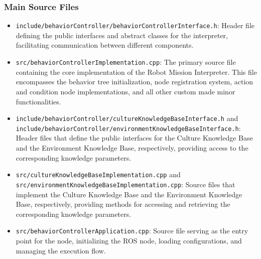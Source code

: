 \documentclass{CSSRforAfrica}
\begin{document}
\subsubsection{Main Source Files}
\begin{itemize}
    \item \texttt{\small include/behaviorController/\textnormal{behaviorControllerInterface.h}}: Header file \\ defining the public interfaces and abstract classes for the interpreter, facilitating communication between different components.

    \item \texttt{\small src/\textnormal{behaviorControllerImplementation.cpp}}: The primary source file containing the core implementation of the Robot Mission Interpreter. This file encompasses the behavior tree initialization, node registration system, action and condition node implementations, and all other custom made minor functionalities.

    \item \texttt{\small include/behaviorController/\textnormal{cultureKnowledgeBaseInterface.h}} and \\ \texttt{\small include/behaviorController/\textnormal{environmentKnowledgeBaseInterface.h}}: Header files that define the public interfaces for the Culture Knowledge Base and the Environment Knowledge Base, respectively, providing access to the corresponding knowledge parameters.

    \item \texttt{\small src/\textnormal{cultureKnowledgeBaseImplementation.cpp}} and \\ \texttt{\small src/\textnormal{environmentKnowledgeBaseImplementation.cpp}}: Source files that implement the Culture Knowledge Base and the Environment Knowledge Base, respectively, providing methods for accessing and retrieving the corresponding knowledge parameters.

    \item \texttt{\small src/\textnormal{behaviorControllerApplication.cpp}}: Source file serving as the entry point for the node, initializing the ROS node, loading configurations, and managing the execution flow.
\end{itemize}
\end{document}
